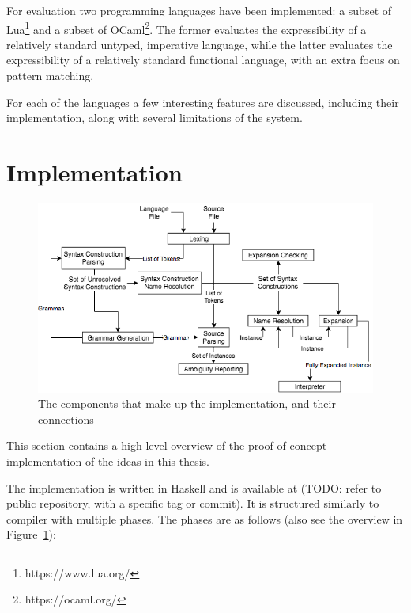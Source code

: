 \documentclass{kththesis}
\begin{document}
For evaluation two programming languages have been implemented: a subset of Lua\footnote{https://www.lua.org/} and a subset of OCaml\footnote{https://ocaml.org/}. The former evaluates the expressibility of a relatively standard untyped, imperative language, while the latter evaluates the expressibility of  a relatively standard functional language, with an extra focus on pattern matching.

For each of the languages a few interesting features are discussed, including their implementation, along with several limitations of the system.

\section{Implementation} \label{sec:implementation}

\begin{figure}[t]
\includegraphics[width=\textwidth]{resources/implementation-flowchart}
\caption{The components that make up the implementation, and their connections}
\label{fig:implementation-flowchart}
\end{figure}

This section contains a high level overview of the proof of concept implementation of the ideas in this thesis.

The implementation is written in Haskell and is available at (TODO: refer to public repository, with a specific tag or commit). It is structured similarly to compiler with multiple phases. The phases are as follows (also see the overview in Figure~\ref{fig:implementation-flowchart}):
\end{document}
